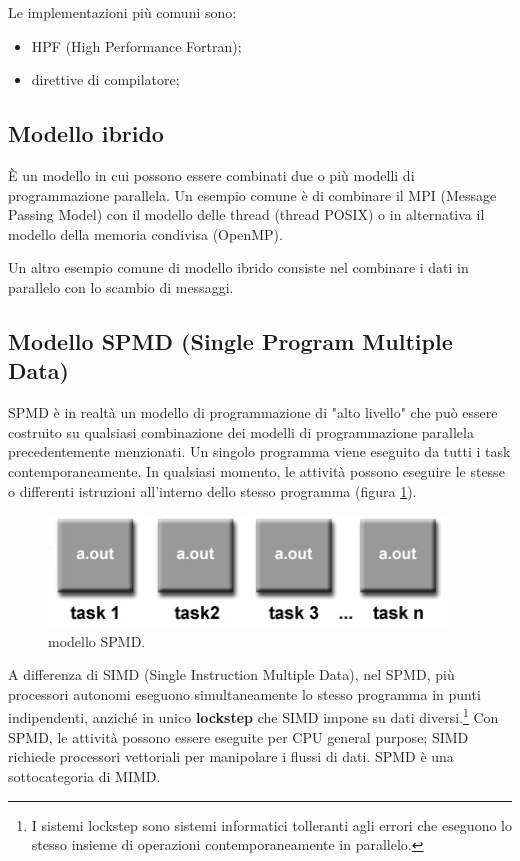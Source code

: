 Le implementazioni più comuni sono:
\begin{itemize}
	\item HPF (High Performance Fortran);
	\item direttive di compilatore;
\end{itemize}

\subsection{Modello ibrido} È un modello in cui possono essere combinati due o più modelli di programmazione parallela. Un esempio comune è di combinare il MPI (Message Passing Model) con il modello delle thread (thread POSIX) o in alternativa il modello della memoria condivisa (OpenMP).

Un altro esempio comune di modello ibrido consiste nel combinare i dati in parallelo con lo scambio di messaggi.
\subsection{Modello SPMD (Single Program Multiple Data)} SPMD è in realtà un modello di programmazione di "alto livello" che può essere costruito su qualsiasi combinazione dei modelli di programmazione parallela precedentemente menzionati. Un singolo programma viene eseguito da tutti i task contemporaneamente. In qualsiasi momento, le attività possono eseguire le stesse o differenti istruzioni all'interno dello stesso programma (figura \ref{fig:spmd}).
\begin{figure}[th]
	\centering
	\includegraphics[width=0.7\linewidth]{img/SPMD}
	\caption{modello SPMD.}
	\label{fig:spmd}
\end{figure}
A differenza di SIMD (Single Instruction Multiple Data), nel SPMD, più processori autonomi eseguono simultaneamente lo stesso programma in punti indipendenti, anziché in unico \textbf{lockstep} che SIMD impone su dati diversi.\footnote{I sistemi lockstep sono sistemi informatici tolleranti agli errori che eseguono lo stesso insieme di operazioni contemporaneamente in parallelo.} Con SPMD, le attività possono essere eseguite per CPU general purpose; SIMD richiede processori vettoriali per manipolare i flussi di dati. SPMD è una sottocategoria di MIMD.

